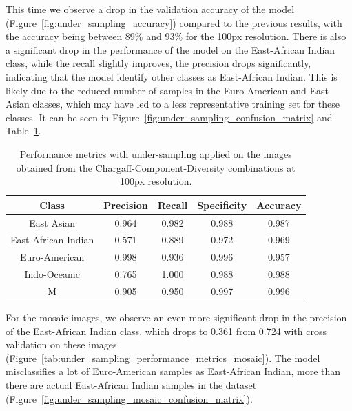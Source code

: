 \label{subsubsec:results_under_sampling}

This time we observe a drop in the validation accuracy of the model (Figure~\ref{fig:under_sampling_accuracy}) compared to the previous results,
with the accuracy being between 89\% and 93\% for the 100px resolution. There is also a significant drop in the performance of the model
on the East-African Indian class, while the recall slightly improves, the precision drops significantly, indicating that the model identify
other classes as East-African Indian. This is likely due to the reduced number of samples in the Euro-American and East Asian classes,
which may have led to a less representative training set for these classes. It can be seen in Figure~\ref{fig:under_sampling_confusion_matrix}
and Table~\ref{tab:under_sampling_performance_metrics}.

\begin{table}[H]
	\centering
	\begin{tabular}{|c|c|c|c|c|}
		\hline
		\textbf{Class}      & \textbf{Precision} & \textbf{Recall} & \textbf{Specificity} & \textbf{Accuracy} \\
		\hline
		East Asian          & 0.964              & 0.982           & 0.988                & 0.987             \\
		East-African Indian & 0.571              & 0.889           & 0.972                & 0.969             \\
		Euro-American       & 0.998              & 0.936           & 0.996                & 0.957             \\
		Indo-Oceanic        & 0.765              & 1.000           & 0.988                & 0.988             \\
		M                   & 0.905              & 0.950           & 0.997                & 0.996             \\
		\hline
	\end{tabular}
	\caption{Performance metrics with under-sampling applied on the images obtained from the Chargaff-Component-Diversity
		combinations at 100px resolution.}
	\label{tab:under_sampling_performance_metrics}
\end{table}

For the mosaic images, we observe an even more significant drop in the precision of the East-African Indian class, which drops to 0.361 from
0.724 with cross validation on these images (Figure~\ref{tab:under_sampling_performance_metrics_mosaic}). The model misclassifies a lot of
Euro-American samples as East-African Indian, more than there are actual East-African Indian samples in the dataset
(Figure~\ref{fig:under_sampling_mosaic_confusion_matrix}).

